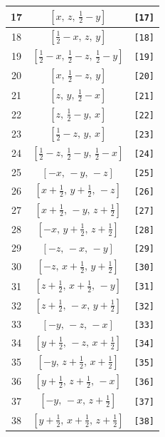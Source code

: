 \documentclass[fleqn,8pt]{jsarticle}
\begin{document}
\begin{longtable}{ccc}
17 & $\left[ x,\, z,\, \frac{1}{2} - y \right]$ & {\tt [17]} \\ \hline
18 & $\left[ \frac{1}{2} - x,\, z,\, y \right]$ & {\tt [18]} \\ \hline
19 & $\left[ \frac{1}{2} - x,\, \frac{1}{2} - z,\, \frac{1}{2} - y \right]$ & {\tt [19]} \\ \hline
20 & $\left[ x,\, \frac{1}{2} - z,\, y \right]$ & {\tt [20]} \\ \hline
21 & $\left[ z,\, y,\, \frac{1}{2} - x \right]$ & {\tt [21]} \\ \hline
22 & $\left[ z,\, \frac{1}{2} - y,\, x \right]$ & {\tt [22]} \\ \hline
23 & $\left[ \frac{1}{2} - z,\, y,\, x \right]$ & {\tt [23]} \\ \hline
24 & $\left[ \frac{1}{2} - z,\, \frac{1}{2} - y,\, \frac{1}{2} - x \right]$ & {\tt [24]} \\ \hline
25 & $\left[ - x,\, - y,\, - z \right]$ & {\tt [25]} \\ \hline
26 & $\left[ x + \frac{1}{2},\, y + \frac{1}{2},\, - z \right]$ & {\tt [26]} \\ \hline
27 & $\left[ x + \frac{1}{2},\, - y,\, z + \frac{1}{2} \right]$ & {\tt [27]} \\ \hline
28 & $\left[ - x,\, y + \frac{1}{2},\, z + \frac{1}{2} \right]$ & {\tt [28]} \\ \hline
29 & $\left[ - z,\, - x,\, - y \right]$ & {\tt [29]} \\ \hline
30 & $\left[ - z,\, x + \frac{1}{2},\, y + \frac{1}{2} \right]$ & {\tt [30]} \\ \hline
31 & $\left[ z + \frac{1}{2},\, x + \frac{1}{2},\, - y \right]$ & {\tt [31]} \\ \hline
32 & $\left[ z + \frac{1}{2},\, - x,\, y + \frac{1}{2} \right]$ & {\tt [32]} \\ \hline
33 & $\left[ - y,\, - z,\, - x \right]$ & {\tt [33]} \\ \hline
34 & $\left[ y + \frac{1}{2},\, - z,\, x + \frac{1}{2} \right]$ & {\tt [34]} \\ \hline
35 & $\left[ - y,\, z + \frac{1}{2},\, x + \frac{1}{2} \right]$ & {\tt [35]} \\ \hline
36 & $\left[ y + \frac{1}{2},\, z + \frac{1}{2},\, - x \right]$ & {\tt [36]} \\ \hline
37 & $\left[ - y,\, - x,\, z + \frac{1}{2} \right]$ & {\tt [37]} \\ \hline
38 & $\left[ y + \frac{1}{2},\, x + \frac{1}{2},\, z + \frac{1}{2} \right]$ & {\tt [38]} \\ \hline

\end{longtable}
\end{document}
